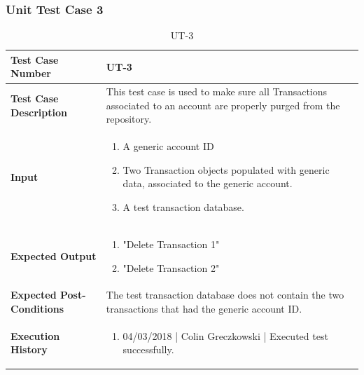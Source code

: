 \documentclass[12pt]{article}
\begin{document}
\subsubsection{Unit Test Case 3} 
\def\arraystretch{1.5}%
\begin{table}[htbp]
\centering
\caption {UT-3}
\label{UT-3}
\begin{tabularx}{\textwidth}{ | l | X |}
\hline
\textbf{Test Case Number}      &  UT-3                         \\ \hline
\textbf{Test Case Description}    &  This test case is used to make sure all Transactions associated to an account are properly purged from the repository.                \\ \hline
\textbf{Input}         & 	\begin{enumerate}
          \item A generic account ID
	\item Two Transaction objects populated with generic data, associated to the generic account.
	\item A test transaction database.
\end{enumerate} \\ \hline

\textbf{Expected Output}     & \begin{enumerate}
	\item "Delete Transaction 1"
           \item "Delete Transaction 2"
\end{enumerate} \\ \hline
\textbf{Expected Post-Conditions}           & The test transaction database does not contain the two transactions that had the generic account ID.                \\ \hline
\textbf{Execution History}   &  \begin{enumerate}
	\item 04/03/2018 | Colin Greczkowski | Executed test successfully.
\end {enumerate} \\ \hline
\end{tabularx}
\end{table}
\clearpage

\end{document}
